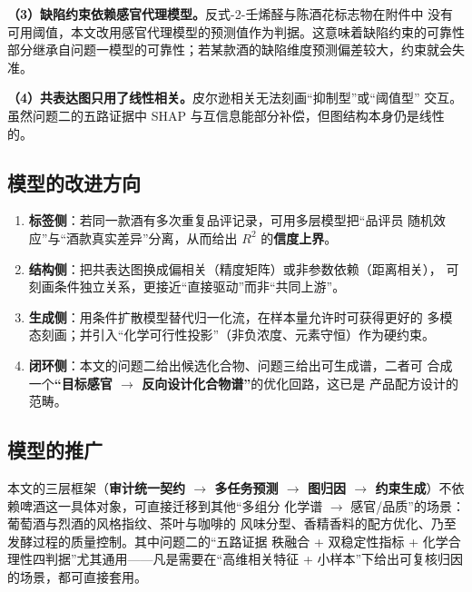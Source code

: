 \textbf{（3）缺陷约束依赖感官代理模型。}反式-2-壬烯醛与陈酒花标志物在附件中
没有可用阈值，本文改用感官代理模型的预测值作为判据。这意味着缺陷约束的可靠性
部分继承自问题一模型的可靠性；若某款酒的缺陷维度预测偏差较大，约束就会失准。

\textbf{（4）共表达图只用了线性相关。}皮尔逊相关无法刻画“抑制型”或“阈值型”
交互。虽然问题二的五路证据中 SHAP 与互信息能部分补偿，但图结构本身仍是线性的。

\subsection{模型的改进方向}

\begin{enumerate}[label=(\arabic*),leftmargin=2.2em,itemsep=1pt]
\item \textbf{标签侧}：若同一款酒有多次重复品评记录，可用多层模型把“品评员
  随机效应”与“酒款真实差异”分离，从而给出 $R^2$ 的\textbf{信度上界}。
\item \textbf{结构侧}：把共表达图换成偏相关（精度矩阵）或非参数依赖（距离相关），
  可刻画条件独立关系，更接近“直接驱动”而非“共同上游”。
\item \textbf{生成侧}：用条件扩散模型替代归一化流，在样本量允许时可获得更好的
  多模态刻画；并引入“化学可行性投影”（非负浓度、元素守恒）作为硬约束。
\item \textbf{闭环侧}：本文的问题二给出候选化合物、问题三给出可生成谱，二者可
  合成一个\textbf{“目标感官 $\rightarrow$ 反向设计化合物谱”}的优化回路，这已是
  产品配方设计的范畴。
\end{enumerate}

\subsection{模型的推广}

本文的三层框架（\textbf{审计统一契约 $\rightarrow$ 多任务预测 $\rightarrow$ 图归因
$\rightarrow$ 约束生成}）不依赖啤酒这一具体对象，可直接迁移到其他“多组分
化学谱 $\rightarrow$ 感官/品质”的场景：葡萄酒与烈酒的风格指纹、茶叶与咖啡的
风味分型、香精香料的配方优化、乃至发酵过程的质量控制。其中问题二的“五路证据
秩融合 + 双稳定性指标 + 化学合理性四判据”尤其通用——凡是需要在“高维相关特征
+ 小样本”下给出可复核归因的场景，都可直接套用。
